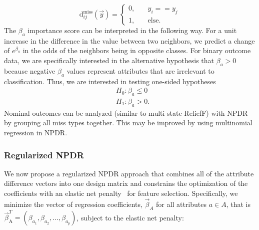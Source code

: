 \documentclass[10pt]{article}
\begin{document}
\begin{equation}\label{eq:hitdiff}
\text{d}^{\text{miss}}_{ij}(\vec{y}) = \left\{
    \begin{array}{ll}
        0, & \quad  y_{i} == y_{j} \\
        1, & \quad \text{else}.
    \end{array}
\right.
\end{equation}
The $\beta_a$ importance score can be interpreted in the following way. For a unit increase in the difference in the value between two neighbors, we predict a change of $e^{\beta_a}$ in the odds of the neighbors being in opposite classes. For binary outcome data, we are specifically interested in the alternative hypothesis that $\beta_a>0$ because negative $\beta_a$ values represent attributes that are irrelevant to classification. Thus, we are interested in testing one-sided hypotheses
\begin{equation}
\begin{aligned}
    & H_0: \beta_a \le 0 \\
    & H_1: \beta_a > 0.
\end{aligned}
\end{equation}
Nominal outcomes can be analyzed (similar to multi-state ReliefF) with NPDR by grouping all miss types together. This may be improved by using multinomial regression in NPDR. 

\subsubsection{Regularized NPDR}

We now propose a regularized NPDR approach that combines all of the attribute difference vectors into one design matrix and constrains the optimization of the coefficients with an elastic net penalty~\cite{glmnet05} for feature selection.
Specifically, we minimize the vector of regression coefficients, $ \vec{\beta}_A$ for all attributes $a \in A$, that is $\vec{\beta}^{T}_{\text{A}} = (\beta_{a_1}, \beta_{a_2}, \ldots, \beta_{a_p})$, subject to the elastic net penalty: 
\end{document}
